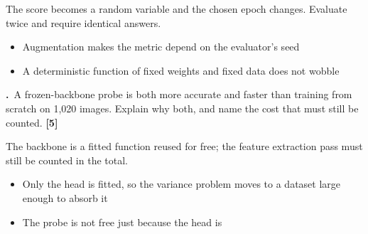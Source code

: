 \documentclass[11pt,a4paper]{article}
\newcounter{exq}[section]
\newcommand{\question}[2]{%
  \refstepcounter{exq}%
  \medskip
  \noindent
  \begin{minipage}{\textwidth}
    \textbf{\theexq.}~#1 \hfill{\color{aimlmuted}\textbf{[#2]}}
  \end{minipage}\par}
\begin{document}
\begin{solution}[title={Solution}]
The score becomes a random variable and the chosen epoch changes. Evaluate twice and require identical answers.
\begin{itemize}[leftmargin=*,nosep]
  \item Augmentation makes the metric depend on the evaluator's seed
  \item A deterministic function of fixed weights and fixed data does not wobble
\end{itemize}
\end{solution}
\question{A frozen-backbone probe is both more accurate and faster than training from scratch on 1,020 images. Explain why both, and name the cost that must still be counted.}{5}
\begin{solution}[title={Solution}]
The backbone is a fitted function reused for free; the feature extraction pass must still be counted in the total.
\begin{itemize}[leftmargin=*,nosep]
  \item Only the head is fitted, so the variance problem moves to a dataset large enough to absorb it
  \item The probe is not free just because the head is
\end{itemize}
\end{solution}
\end{document}
